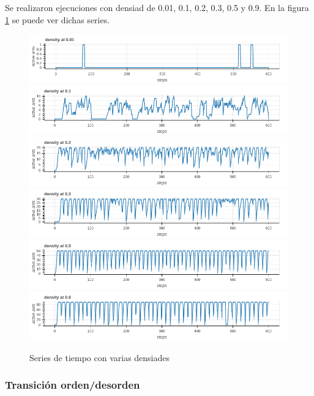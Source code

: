 \documentclass{article}
\begin{document}
Se realizaron ejecuciones con densiad de 0.01, 0.1, 0.2, 0.3, 0.5 y 0.9. En la
figura \ref{fig:ds} se puede ver dichas series.

\begin{figure}
  \centering
  \includegraphics[width=\textwidth]{imgs/ant001.png}
  \includegraphics[width=\textwidth]{imgs/ant01.png}
  \includegraphics[width=\textwidth]{imgs/ant02.png}
  \includegraphics[width=\textwidth]{imgs/ant03.png}
  \includegraphics[width=\textwidth]{imgs/ant05.png}
  \includegraphics[width=\textwidth]{imgs/ant09.png}
  \caption{Series de tiempo con varias densiades}
  \label{fig:ds}
\end{figure}

\subsubsection{Transición orden/desorden}
\end{document}
